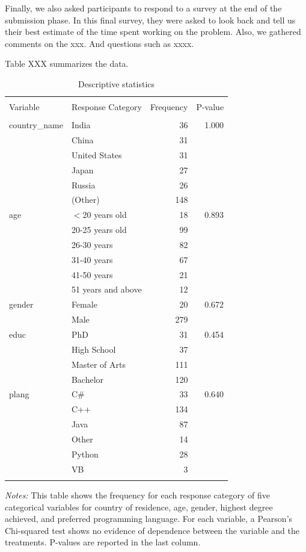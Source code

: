 \documentclass[12pt,]{article}
\newenvironment{tablenotes}[1][]{
  \begin{minipage}{\textwidth}\emph{Notes:}{\footnotesize #1}
}{\end{minipage}}
\begin{document}
Finally, we also asked participants to respond to a survey at the end of
the submission phase. In this final survey, they were asked to look back
and tell us their best estimate of the time spent working on the
problem. Also, we gathered comments on the xxx. And questions such as
xxxx.

Table XXX summarizes the data.

\begin{table}
\centering
\caption{Descriptive statistics}
\label{tab: desc}
\begin{tabular}{lp{4cm}rr}
  \\[-1.8ex]\hline \hline \\[-1.8ex]
Variable & Response Category & Frequency & P-value \\ 
  \hline \\[-1.86ex]
country\_name & India & 36 & 1.000 \\ 
   & China & 31 &  \\ 
   & United States & 31 &  \\ 
   & Japan & 27 &  \\ 
   & Russia & 26 &  \\ 
   & (Other) & 148 &  \\ 
  age & $<$20 years old & 18 & 0.893 \\ 
   & 20-25 years old & 99 &  \\ 
   & 26-30 years & 82 &  \\ 
   & 31-40 years & 67 &  \\ 
   & 41-50 years & 21 &  \\ 
   & 51 years and above & 12 &  \\ 
  gender & Female & 20 & 0.672 \\ 
   & Male & 279 &  \\ 
  educ & PhD & 31 & 0.454 \\ 
   & High School & 37 &  \\ 
   & Master of Arts & 111 &  \\ 
   & Bachelor & 120 &  \\ 
  plang & C\# & 33 & 0.640 \\ 
   & C++ & 134 &  \\ 
   & Java & 87 &  \\ 
   & Other & 14 &  \\ 
   & Python & 28 &  \\ 
   & VB & 3 &  \\ 
   \hline \\[-1.8ex]
\end{tabular}
\begin{tablenotes}\footnotesize
This table shows the frequency for each response category of five categorical variables for country of residence, age, gender, highest degree achieved, and preferred programming language. For each variable, a Pearson's Chi-squared test shows no evidence of dependence  between the variable and the treatments. P-values are reported in the last column.
\end{tablenotes}
\end{table}
\end{document}
